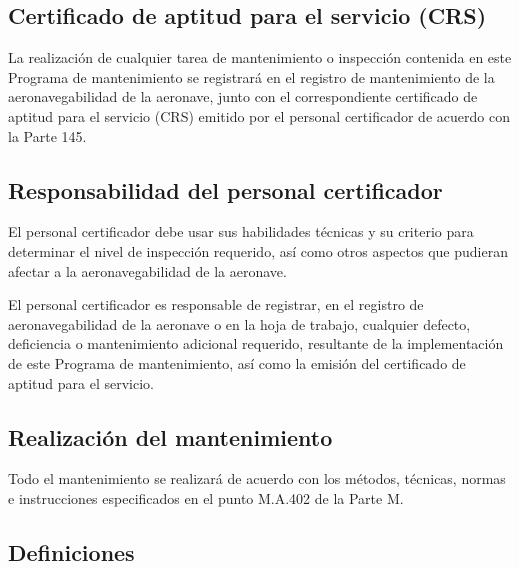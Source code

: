 \documentclass[
]{article}
\begin{document}
\hypertarget{certificado-de-aptitud-para-el-servicio-crs}{%
\subsection{Certificado de aptitud para el servicio
(CRS)}\label{certificado-de-aptitud-para-el-servicio-crs}}

La realización de cualquier tarea de mantenimiento o inspección
contenida en este Programa de mantenimiento se registrará en el registro
de mantenimiento de la aeronavegabilidad de la aeronave, junto con el
correspondiente certificado de aptitud para el servicio (CRS) emitido
por el personal certificador de acuerdo con la Parte 145.

\hypertarget{responsabilidad-del-personal-certificador}{%
\subsection{Responsabilidad del personal
certificador}\label{responsabilidad-del-personal-certificador}}

El personal certificador debe usar sus habilidades técnicas y su
criterio para determinar el nivel de inspección requerido, así como
otros aspectos que pudieran afectar a la aeronavegabilidad de la
aeronave.

El personal certificador es responsable de registrar, en el registro de
aeronavegabilidad de la aeronave o en la hoja de trabajo, cualquier
defecto, deficiencia o mantenimiento adicional requerido, resultante de
la implementación de este Programa de mantenimiento, así como la emisión
del certificado de aptitud para el servicio.

\hypertarget{realizaciuxf3n-del-mantenimiento}{%
\subsection{Realización del
mantenimiento}\label{realizaciuxf3n-del-mantenimiento}}

Todo el mantenimiento se realizará de acuerdo con los métodos, técnicas,
normas e instrucciones especificados en el punto M.A.402 de la Parte M.

\hypertarget{section-2}{%
\subsection*{}\label{section-2}}

\newpage
\hypertarget{definiciones}{%
\subsection{Definiciones}\label{definiciones}}
\end{document}
